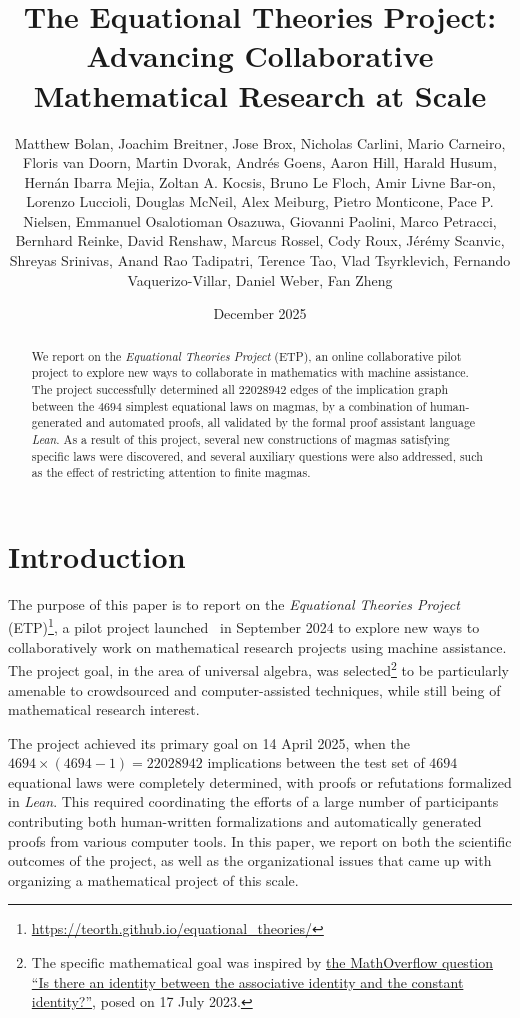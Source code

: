 \documentclass[12pt]{amsart}
\title[Equational Theories Project]{The Equational Theories Project: Advancing Collaborative Mathematical Research at Scale}
\author[Equational Theories Project contributors]{Matthew Bolan, Joachim Breitner, Jose Brox, Nicholas Carlini, Mario Carneiro, Floris van Doorn,
  Martin Dvorak, Andr\'es Goens, Aaron Hill, Harald Husum, Hern\'an Ibarra Mejia, Zoltan A. Kocsis, Bruno Le Floch, Amir Livne Bar-on, Lorenzo Luccioli, Douglas McNeil,
  Alex Meiburg, Pietro Monticone, Pace P. Nielsen, Emmanuel Osalotioman Osazuwa, Giovanni Paolini, Marco Petracci, Bernhard Reinke, David Renshaw, Marcus Rossel, Cody Roux,
  J\'er\'emy Scanvic, Shreyas Srinivas, Anand Rao Tadipatri, Terence Tao, Vlad Tsyrklevich, Fernando Vaquerizo-Villar,
  Daniel Weber, Fan Zheng}
\date{December 2025}
\theoremstyle{definition}
\begin{document}
\begin{abstract}
  We report on the \emph{Equational Theories Project} (ETP), an online collaborative pilot project
  to explore new ways to collaborate in mathematics with machine assistance. The project successfully determined all $\num{22028942}$ edges of the implication graph between the $4694$ simplest equational laws on magmas, by a combination of
  human-generated and automated proofs, all validated by the formal proof assistant language
  \emph{Lean}. As a result of this project, several new constructions of magmas satisfying specific laws were discovered, and several auxiliary questions were also addressed, such as the effect of restricting attention to finite magmas.
\end{abstract}

\begingroup
\def\uppercasenonmath#1{} %
\let\MakeUppercase\relax %
\maketitle
\endgroup

{
\setlength{\parskip}{0em}
\setcounter{tocdepth}{1}
\tableofcontents
}

\section{Introduction}

The purpose of this paper is to report on the \emph{Equational Theories Project} (ETP)\footnote{\url{https://teorth.github.io/equational_theories/}}, a pilot project launched~\cite{Tao_blog_Sep_2024} in September 2024 to explore new ways to collaboratively work on mathematical research projects using machine assistance. The project goal, in the area of universal algebra, was selected\footnote{The specific mathematical goal was inspired by \href{https://mathoverflow.net/questions/450930}{the MathOverflow question ``Is there an identity between the associative identity and the constant identity?''}, posed on 17 July 2023.} to be particularly amenable to crowdsourced and computer-assisted techniques, while still being of mathematical research interest.

The project achieved its primary goal on 14 April 2025, when the $\num{4694} \times (\num{4694}-1) = \num{22028942}$ implications between the test set of $\num{4694}$ equational laws were completely determined, with proofs or refutations formalized in \emph{Lean}.  This required coordinating the efforts of a large number of participants contributing both human-written formalizations and automatically generated proofs from various computer tools.  In this paper, we report on both the scientific outcomes of the project, as well as the organizational issues that came up with organizing a mathematical project of this scale.
\end{document}
